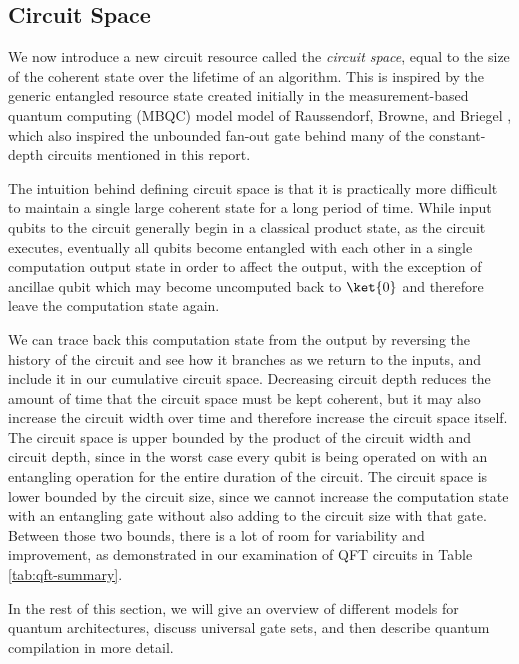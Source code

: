 \subsection{Circuit Space}

We now introduce a new circuit resource called the \emph{circuit space},
equal to the size of the coherent state over the lifetime of an algorithm.
This is inspired by the generic entangled resource state created initially
in the measurement-based quantum computing (MBQC) model
model of Raussendorf, Browne, and Briegel \cite{Raussendorf2003},
which also inspired the unbounded fan-out gate behind many of the constant-depth
circuits mentioned in this report.

The intuition behind defining circuit space is that it is practically
more difficult to maintain a single large coherent state for a long period
of time. While input qubits to the circuit generally begin in a classical
product state, as the circuit executes, eventually all qubits become entangled
with each other in a single computation output state
in order to affect the output, with the exception of
ancillae qubit which may become uncomputed back to $\ket{0}$ and therefore
leave the computation state again.

We can trace back this computation state from the output by reversing the
history of the circuit and see how it
branches as we return to the inputs, and include it in our cumulative
circuit space.
Decreasing circuit depth reduces the amount of time that the circuit space
must be kept coherent, but it may also increase the circuit
width over time and therefore increase the circuit space itself.
The circuit space is upper bounded by the product of the circuit width and
circuit depth, since in the worst case every qubit is being operated on with
an entangling operation for the entire duration of the circuit.
The circuit space is lower bounded by the circuit size, since we cannot
increase the computation state with an entangling gate without also
adding to the circuit size with that gate. Between those two bounds, there is
a lot of room for variability and improvement, as demonstrated in our
examination of QFT circuits in Table \ref{tab:qft-summary}.

In the rest of this section, we will give an overview of different models for
quantum architectures, discuss universal gate sets,
and then describe quantum compilation in more detail.


